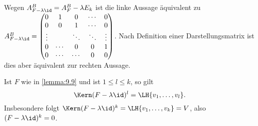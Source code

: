 \begin{beweis}
	Wegen $A_{F - \lambda \id}^B = A_F^B - \lambda E_k$ ist die linke Aussage äquivalent zu $A_{F - \lambda \id}^B = \begin{pmatrix}
		0 & 1 & 0 & \cdots & 0 \\ 
		0 & 0 & 1 & \cdots & 0 \\ 
		\vdots &  & \ddots & \ddots & \vdots \\ 
		0 & \cdots & 0 & 0 & 1 \\ 
		0 & \cdots & \cdots & 0 & 0
		\end{pmatrix}$.
	Nach Definition einer Darstellungsmatrix ist dies aber äquivalent zur rechten Aussage.  
\end{beweis}

\begin{bemerkung}
	\label{bem:9.10}
	Ist $F$ wie in \autoref{lemma:9.9} und ist $1 \leq l \leq k$, so gilt
	\[
		\Kern(F-\lambda \id)^l = \LH\{v_1,\dots,v_l\}.
	\]
	Insbesondere folgt $\Kern(F- \lambda \id)^k = \LH\{v_1,\dots,v_k\} = V$, also $(F-\lambda \id)^k = 0$.
	

\end{bemerkung}
